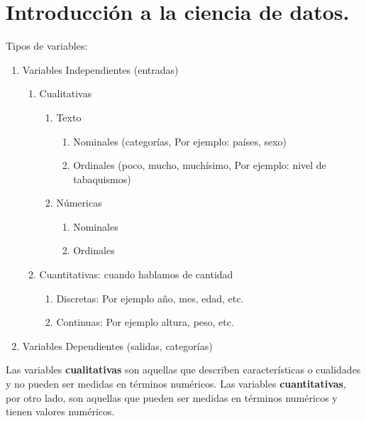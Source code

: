 \documentclass[../main.tex]{subfiles}
\begin{document}

\section{Introducción  a la ciencia de datos.}
    Tipos de variables:
    \begin{enumerate}
        \item Variables Independientes (entradas)
            \begin{enumerate}
                \item Cualitativas
                    \begin{enumerate}
                        \item Texto
                            \begin{enumerate}
                                \item Nominales (categorías, Por ejemplo: países, sexo)
                                \item Ordinales (poco, mucho, muchísimo, Por ejemplo: nivel de tabaquismos)
                                
                            \end{enumerate}
                        \item Númericas
                            \begin{enumerate}
                                \item Nominales
                                \item Ordinales
                            \end{enumerate}
                    \end{enumerate}
                \item Cuantitativas: cuando hablamos de cantidad
                    \begin{enumerate}
                        \item Discretas: Por ejemplo año, mes, edad, etc.
                        \item Continuas: Por ejemplo altura, peso, etc.
                    \end{enumerate}
            \end{enumerate}
        \item Variables Dependientes (salidas, categorías)
    \end{enumerate}
	
    Las variables \textbf{cualitativas} son aquellas que describen características o cualidades y no pueden ser medidas en términos numéricos. Las variables \textbf{cuantitativas}, por otro lado, son aquellas que pueden ser medidas en términos numéricos y tienen valores numéricos.\\
		
\end{document}
